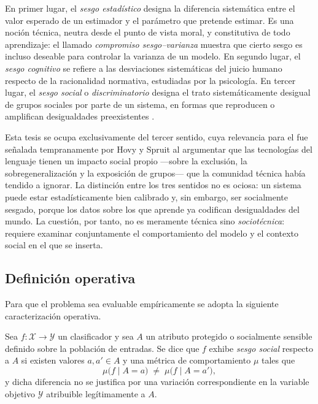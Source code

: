 En primer lugar, el \emph{sesgo estadístico} designa la diferencia sistemática
entre el valor esperado de un estimador y el parámetro que pretende estimar. Es
una noción técnica, neutra desde el punto de vista moral, y constitutiva de
todo aprendizaje: el llamado \emph{compromiso sesgo--varianza} muestra que
cierto sesgo es incluso deseable para controlar la varianza de un modelo. En
segundo lugar, el \emph{sesgo cognitivo} se refiere a las desviaciones
sistemáticas del juicio humano respecto de la racionalidad normativa, estudiadas
por la psicología. En tercer lugar, el \emph{sesgo social} o
\emph{discriminatorio} designa el trato sistemáticamente desigual de grupos
sociales por parte de un sistema, en formas que reproducen o amplifican
desigualdades preexistentes \cite{Mehrabi2021Survey}.

Esta tesis se ocupa exclusivamente del tercer sentido, cuya relevancia para el
\PLN fue señalada tempranamente por Hovy y Spruit \cite{HovySpruit2016} al
argumentar que las tecnologías del lenguaje tienen un impacto social propio
---sobre la exclusión, la sobregeneralización y la exposición de grupos---
que la comunidad técnica había tendido a ignorar. La distinción entre los tres
sentidos no es ociosa: un sistema puede estar estadísticamente bien calibrado
y, sin embargo, ser socialmente sesgado, porque los datos sobre los que aprende
ya codifican desigualdades del mundo. La cuestión, por tanto, no es meramente técnica sino
\emph{sociotécnica}: requiere examinar conjuntamente el comportamiento del
modelo y el contexto social en el que se inserta.

\subsection{Definición operativa}
\label{sec:definicion-sesgo}

Para que el problema sea evaluable empíricamente se adopta la siguiente
caracterización operativa.

\begin{definicion}
\label{def:sesgo}
Sea $f : \mathcal{X} \to \mathcal{Y}$ un clasificador y sea $A$ un atributo
protegido o socialmente sensible definido sobre la población de entradas. Se
dice que $f$ exhibe \emph{sesgo social} respecto a $A$ si existen valores
$a, a' \in A$ y una métrica de comportamiento $\mu$ tales que
\[
  \mu\bigl(f \mid A = a\bigr) \;\neq\; \mu\bigl(f \mid A = a'\bigr),
\]
y dicha diferencia no se justifica por una variación correspondiente en la
variable objetivo $\mathcal{Y}$ atribuible legítimamente a $A$.
\end{definicion}

